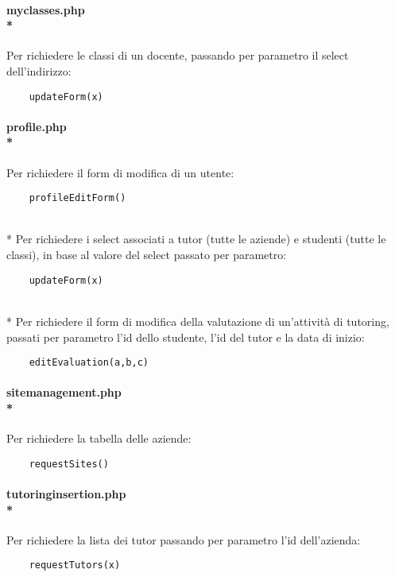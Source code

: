 \documentclass[12pt]{article}
\begin{document}
\paragraph{myclasses.php\\*}
\noindent
Per richiedere le classi di un docente, passando per parametro il select dell'indirizzo:
\begin{verbatim}
    updateForm(x)
\end{verbatim}

\paragraph{profile.php\\*}
\noindent
Per richiedere il form di modifica di un utente:
\begin{verbatim}
    profileEditForm()
\end{verbatim}

\\*
\noindent
Per richiedere i select associati a tutor (tutte le aziende) e studenti (tutte le classi), in base al valore del select passato per parametro:
\begin{verbatim}
    updateForm(x)
\end{verbatim}

\\*
\noindent
Per richiedere il form di modifica della valutazione di un'attività di tutoring, passati per parametro l'id dello studente, l'id del tutor e la data di inizio:
\begin{verbatim}
    editEvaluation(a,b,c)
\end{verbatim}

\paragraph{sitemanagement.php\\*}
\noindent
Per richiedere la tabella delle aziende:
\begin{verbatim}
    requestSites()
\end{verbatim}

\paragraph{tutoringinsertion.php\\*}
\noindent
Per richiedere la lista dei tutor passando per parametro l'id dell'azienda:
\begin{verbatim}
    requestTutors(x)
\end{verbatim}
\end{document}
